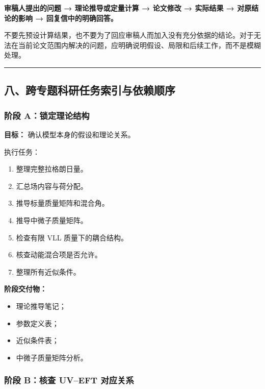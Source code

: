 \documentclass[
]{article}
\providecommand{\tightlist}{%
  \setlength{\itemsep}{0pt}\setlength{\parskip}{0pt}}
\begin{document}
\textbf{审稿人提出的问题 → 理论推导或定量计算 → 论文修改 → 实际结果 →
对原结论的影响 → 回复信中的明确回答。}

不要先预设计算结果，也不要为了回应审稿人而加入没有充分依据的结论。对于无法在当前论文范围内解决的问题，应明确说明假设、局限和后续工作，而不是模糊处理。

\begin{center}\rule{0.5\linewidth}{0.5pt}\end{center}

\subsection{八、跨专题科研任务索引与依赖顺序}\label{ux516bux8de8ux4e13ux9898ux79d1ux7814ux4efbux52a1ux7d22ux5f15ux4e0eux4f9dux8d56ux987aux5e8f}

\subsubsection{阶段
A：锁定理论结构}\label{ux9636ux6bb5-aux9501ux5b9aux7406ux8bbaux7ed3ux6784}

\textbf{目标：} 确认模型本身的假设和理论关系。

执行任务：

\begin{enumerate}
\def\labelenumi{\arabic{enumi}.}
\tightlist
\item
  整理完整拉格朗日量。
\item
  汇总场内容与荷分配。
\item
  推导标量质量矩阵和混合角。
\item
  推导中微子质量矩阵。
\item
  检查有限 VLL 质量下的耦合结构。
\item
  核查动能混合项是否允许。
\item
  整理所有近似条件。
\end{enumerate}

\textbf{阶段交付物：}

\begin{itemize}
\tightlist
\item
  理论推导笔记；
\item
  参数定义表；
\item
  近似条件表；
\item
  中微子质量矩阵分析。
\end{itemize}

\subsubsection{阶段 B：核查 UV--EFT
对应关系}\label{ux9636ux6bb5-bux6838ux67e5-uveft-ux5bf9ux5e94ux5173ux7cfb}
\end{document}
